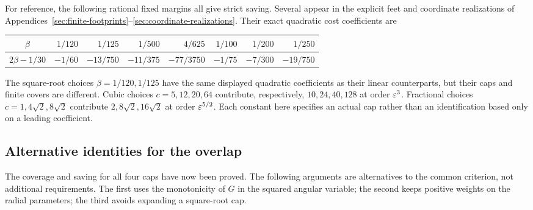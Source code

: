For reference, the following rational fixed margins all give strict
saving. Several appear in the explicit feet and coordinate realizations
of Appendices~\ref{sec:finite-footprints}--\ref{sec:coordinate-realizations}.
Their exact quadratic cost coefficients are
\begin{center}
\begin{tabular}{c|rrrrrrr}
$\beta$&$1/120$&$1/125$&$1/500$&$4/625$&$1/100$&$1/200$&$1/250$\\
\hline
$2\beta-1/30$&$-1/60$&$-13/750$&$-11/375$&$-77/3750$&$-1/75$&$-7/300$&$-19/750$
\end{tabular}
\end{center}
The square-root choices $\beta=1/120,1/125$ have the same displayed
quadratic coefficients as their linear counterparts, but their caps and
finite covers are different. Cubic choices $c=5,12,20,64$ contribute,
respectively, $10,24,40,128$ at order $\varepsilon^3$. Fractional choices
$c=1,4\sqrt2,8\sqrt2$ contribute $2,8\sqrt2,16\sqrt2$ at order
$\varepsilon^{5/2}$. Each constant here specifies an actual cap rather than an
identification based only on a leading coefficient.

\subsection{Alternative identities for the overlap}

The coverage and saving for all four caps have now been proved.
The following arguments are alternatives to the common criterion, not
additional requirements. The first uses the monotonicity of $G$ in the
squared angular variable; the second keeps positive weights on the radial
parameters; the third avoids expanding a square-root cap.

